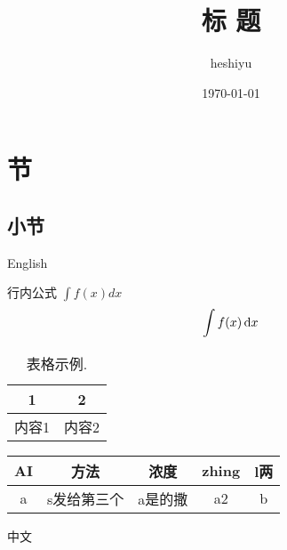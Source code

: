 \documentclass[12pt,a4paper,UTF8]{article}
\title{标 题}
\author{heshiyu}
\date{\today}
\begin{document}
\maketitle

\section{节}
\subsection{小节}

\textrm{English}

行内公式 $\int f(x) dx$
\begin{equation}
    \int f(x) \dif x
    \label{eq:1}
\end{equation}



\begin{table}[htb]
    \centering
    \caption{表格示例.}
    \begin{tabular}{cc}
        \hline
        \hline 1    & 2    \\
        \hline 内容1 & 内容2 \\
        \hline
    \end{tabular}
\end{table}

\begin{table}[htb]
    \begin{tabular}{@{}ccccc@{}}
    \toprule
    AI & 方法     & 浓度   & zhing & l两 \\ \midrule
    a  & s发给第三个 & a是的撒 & a2    & b  \\ \bottomrule
    \end{tabular}
\end{table}

中文


% 
% 
\end{document}
